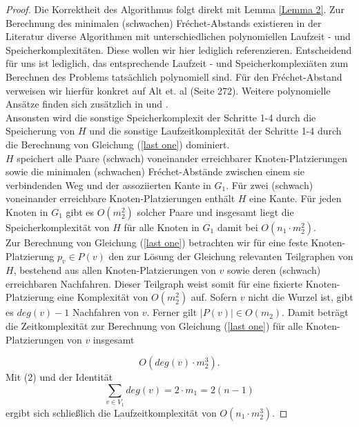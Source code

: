 \documentclass[a4paper, 12pt, twoside]{article}
\theoremstyle{Format1} %
\begin{document}
\begin{proof}
Die Korrektheit des Algorithmus folgt direkt mit Lemma \ref{Lemma 2}.
Zur Berechnung des minimalen (schwachen) Fréchet-Abstands existieren in der Literatur diverse Algorithmen mit unterschiedlichen polynomiellen Laufzeit - und Speicherkomplexitäten.
Diese wollen wir hier lediglich referenzieren. Entscheidend für uns ist lediglich, das entsprechende Laufzeit - und Speicherkomplexiäten zum Berechnen des Problems
tatsächlich polynomiell sind.
Für den Fréchet-Abstand verweisen wir hierfür konkret auf Alt et. al \cite{Alt2} (Seite 272). Weitere polynomielle Ansätze finden sich zusätzlich in \cite{Ref1} und \cite{Ref2}.
\\
Ansonsten wird die sonstige Speicherkomplexit der Schritte 1-4 durch die Speicherung von $H$ und die sonstige Laufzeitkomplexität der Schritte 1-4 durch die Berechnung von
Gleichung (\ref{last one}) dominiert.
\\
$H$ speichert alle Paare (schwach) voneinander erreichbarer Knoten-Platzierungen sowie die minimalen (schwachen) Fréchet-Abstände zwischen einem sie verbindenden Weg
und der assoziierten Kante in $G_1$. Für zwei (schwach) voneinander erreichbare Knoten-Platzierungen enthält $H$ eine Kante. Für jeden Knoten in $G_1$ gibt es $O(m_2^2)$ solcher Paare
und insgesamt liegt die Speicherkomplexität von $H$ für alle Knoten in $G_1$ damit bei $O(n_1 \cdot m_2^2)$.
\\
Zur Berechnung von Gleichung (\ref{last one}) betrachten wir für eine feste Knoten-Platzierung $p_v \in P(v)$ den zur Lösung der Gleichung relevanten Teilgraphen von $H$,
bestehend aus allen Knoten-Platzierungen von $v$ sowie deren (schwach) erreichbaren Nachfahren. Dieser Teilgraph weist somit für eine fixierte Knoten-Platzierung eine Komplexität von $O(m_2^2)$ auf.
Sofern $v$ nicht die Wurzel ist, gibt es $deg(v)-1$ Nachfahren von $v$. Ferner gilt $|P(v)| \in O(m_2)$. Damit beträgt die Zeitkomplexität zur Berechnung von Gleichung (\ref{last one}) für alle
Knoten-Platzierungen von $v$ insgesamt

\begin{equation}
	O(deg(v) \cdot m_2^3).
\end{equation}
Mit (2) und der Identität
\begin{equation}
	\sum_{v \in V_1} deg(v) = 2 \cdot m_1 = 2(n-1)
\end{equation}
ergibt sich schließlich die Laufzeitkomplexität von $O(n_1 \cdot m_2^3).$
\end{proof}
\newpage
\end{document}
